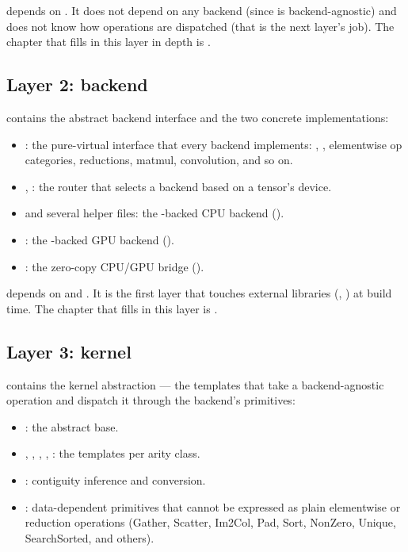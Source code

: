  depends on . It does not depend on any
backend (since  is backend-agnostic) and does not
know how operations are dispatched (that is the next layer's job).
The chapter that fills in this layer in depth is
.

\subsection{Layer 2: backend}
\label{ssec:layered_dag:backend}

 contains the abstract backend interface
and the two concrete implementations:

\begin{itemize}
  \item {}: the pure-virtual interface that every
    backend implements: , ,
    elementwise op categories, reductions, matmul, convolution,
    and so on.
  \item {}, : the router
    that selects a backend based on a tensor's device.
  \item {} and several
    helper files: the \Accelerate-backed CPU backend
    ().
  \item {}: the \MLX-backed GPU
    backend ().
  \item {}: the zero-copy
    CPU/GPU bridge ().
\end{itemize}

 depends on  and . It is the
first layer that touches external libraries (\Accelerate, \MLX) at
build time. The chapter that fills in this layer is
.

\subsection{Layer 3: kernel}
\label{ssec:layered_dag:kernel}

 contains the kernel abstraction --- the
templates that take a backend-agnostic operation and dispatch it
through the backend's primitives:

\begin{itemize}
  \item {}: the abstract base.
  \item {}, ,
    , ,
    : the templates per arity class.
  \item {}: contiguity inference and conversion.
  \item {}: data-dependent primitives that cannot
    be expressed as plain elementwise or reduction operations
    (Gather, Scatter, Im2Col, Pad, Sort, NonZero, Unique,
    SearchSorted, and others).
\end{itemize}

